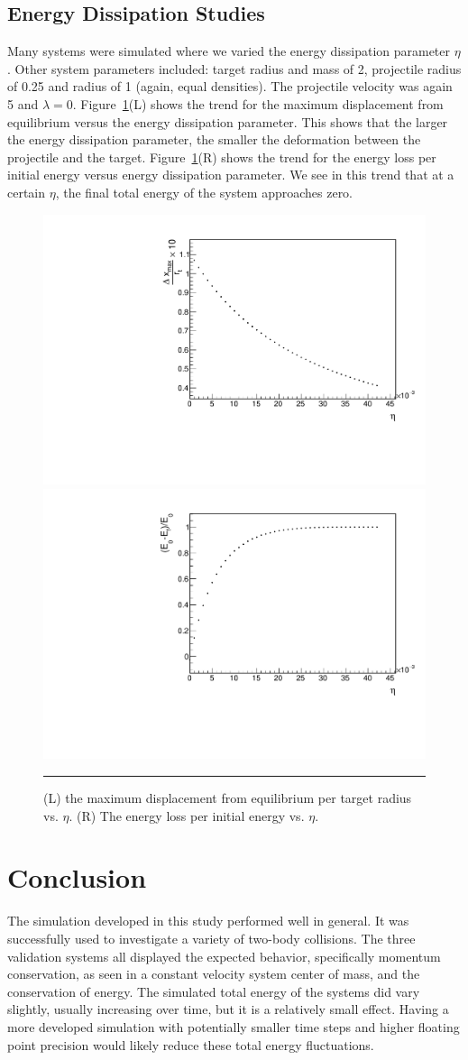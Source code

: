 \documentclass[aps,prl,floatfix,preprint,nofootinbib]{revtex4}
\begin{document}
\subsection{Energy Dissipation Studies}
Many systems were simulated where we varied the energy dissipation parameter $\eta$. Other system parameters included: target radius and mass of 2, projectile radius of 0.25 and radius of 1 (again, equal densities). The projectile velocity was again 5 and $\lambda = 0$. Figure~\ref{fig:changing_eta}(L) shows the trend for the maximum displacement from equilibrium versus the energy dissipation parameter. This shows that the larger the energy dissipation parameter, the smaller the deformation between the projectile and the target. Figure~\ref{fig:changing_eta}(R) shows the trend for the energy loss per initial energy versus energy dissipation parameter. We see in this trend that at a certain $\eta$, the final total energy of the system approaches zero.
\begin{figure}
  \includegraphics[width=.45\linewidth]{plots/trend_plots/dxmax_vs_eta.pdf}
  \includegraphics[width=.45\linewidth]{plots/trend_plots/Eloss_vs_eta.pdf}
                  {\par\nobreak\rule[9pt]{35em}{0.5pt}\vspace{-5mm}}
                  \caption{(L) the maximum displacement from equilibrium per target radius vs. $\eta$. (R) The energy loss per initial energy vs. $\eta$.}
                  \label{fig:changing_eta}
\end{figure}


\section{Conclusion}
The simulation developed in this study performed well in general. It was successfully used to investigate a variety of two-body collisions. The three validation systems all displayed the expected behavior, specifically momentum conservation, as seen in a constant velocity system center of mass, and the conservation of energy. The simulated total energy of the systems did vary slightly, usually increasing over time, but it is a relatively small effect. Having a more developed simulation with potentially smaller time steps and higher floating point precision would likely reduce these total energy fluctuations.
\end{document}
